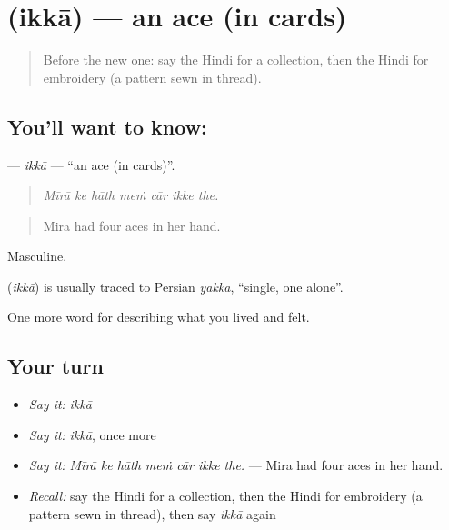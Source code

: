 \section[\texorpdfstring{\hi{इक्का} (ikkā)}{इक्का (ikkā)}]{ (ikkā) — an ace (in cards)}

\label{lesson:HI-C526-ikka}



\begin{quote}
Before the new one: say the Hindi for a collection, then the Hindi for embroidery (a pattern sewn in thread).
\end{quote}

\subsection*{You'll want to know: }
\textbf{} — \emph{ikkā} — \textquotedblleft{}an ace (in cards)\textquotedblright{}.

\begin{quote}
      
\end{quote}

\begin{quote}
\emph{Mīrā ke hāth meṁ cār ikke the.}
\end{quote}

\begin{quote}
Mira had four aces in her hand.
\end{quote}

Masculine.

\begin{cousinweb}
\textbf{} (\emph{ikkā}) is usually traced to Persian \emph{yakka}, \textquotedblleft{}single, one alone\textquotedblright{}.
\end{cousinweb}

\begin{grammarlens}[title={What you've built}]
One more word for describing what you lived and felt.
\end{grammarlens}

\subsection*{Your turn}
\begin{itemize}
\raggedright
  \item \emph{Say it:} \emph{ikkā}
  \item \emph{Say it:} \emph{ikkā}, once more
  \item \emph{Say it:} \emph{Mīrā ke hāth meṁ cār ikke the.} — Mira had four aces in her hand.
  \item \emph{Recall:} say the Hindi for a collection, then the Hindi for embroidery (a pattern sewn in thread), then say \emph{ikkā} again
\end{itemize}


